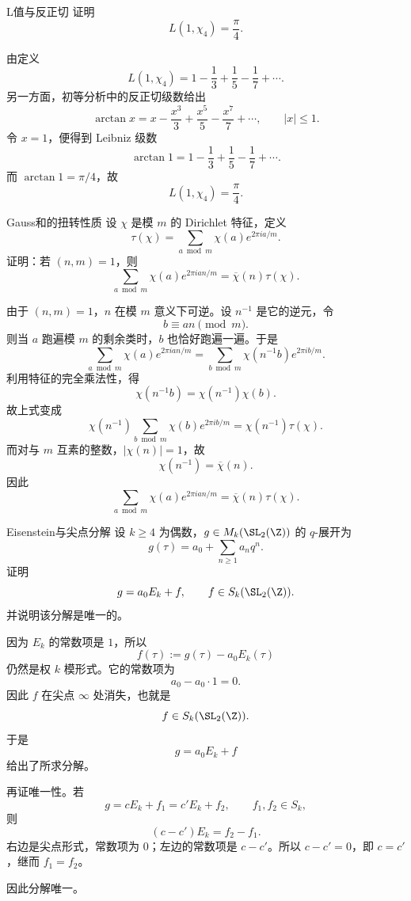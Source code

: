 \begin{problem}{L值与反正切}
\hard
证明
\[
L(1,\chi_4)=\frac{\pi}{4}.
\]
\end{problem}
\begin{solution}
由定义
\[
L(1,\chi_4)=1-\frac13+\frac15-\frac17+\cdots.
\]
另一方面，初等分析中的反正切级数给出
\[
\arctan x=x-\frac{x^3}{3}+\frac{x^5}{5}-\frac{x^7}{7}+\cdots,
\qquad |x|\le 1.
\]
令 $x=1$，便得到 Leibniz 级数
\[
\arctan 1=1-\frac13+\frac15-\frac17+\cdots.
\]
而 $\arctan 1=\pi/4$，故
\[
L(1,\chi_4)=\frac{\pi}{4}.
\]
\end{solution}

\begin{problem}{Gauss和的扭转性质}
\hard
设 $\chi$ 是模 $m$ 的 Dirichlet 特征，定义
\[
\tau(\chi)=\sum_{a\bmod m}\chi(a)e^{2\pi i a/m}.
\]
证明：若 $(n,m)=1$，则
\[
\sum_{a\bmod m}\chi(a)e^{2\pi i an/m}=\overline{\chi}(n)\tau(\chi).
\]
\end{problem}
\begin{solution}
由于 $(n,m)=1$，$n$ 在模 $m$ 意义下可逆。设 $n^{-1}$ 是它的逆元，令
\[
b\equiv an \pmod m.
\]
则当 $a$ 跑遍模 $m$ 的剩余类时，$b$ 也恰好跑遍一遍。于是
\[
\sum_{a\bmod m}\chi(a)e^{2\pi i an/m}
=\sum_{b\bmod m}\chi(n^{-1}b)e^{2\pi i b/m}.
\]
利用特征的完全乘法性，得
\[
\chi(n^{-1}b)=\chi(n^{-1})\chi(b).
\]
故上式变成
\[
\chi(n^{-1})\sum_{b\bmod m}\chi(b)e^{2\pi i b/m}
=\chi(n^{-1})\tau(\chi).
\]
而对与 $m$ 互素的整数，$|\chi(n)|=1$，故
\[
\chi(n^{-1})=\overline{\chi}(n).
\]
因此
\[
\sum_{a\bmod m}\chi(a)e^{2\pi i an/m}=\overline{\chi}(n)\tau(\chi).
\]
\end{solution}

\begin{problem}{Eisenstein与尖点分解}
\hard
设 $k\ge 4$ 为偶数，$g\in M_k(\SL_2(\Z))$ 的 $q$-展开为
\[
g(\tau)=a_0+\sum_{n\ge1}a_n q^n.
\]
证明
\[
g=a_0E_k+f,
\qquad f\in S_k(\SL_2(\Z)).
\]
并说明该分解是唯一的。
\end{problem}
\begin{solution}
因为 $E_k$ 的常数项是 $1$，所以
\[
f(\tau):=g(\tau)-a_0E_k(\tau)
\]
仍然是权 $k$ 模形式。它的常数项为
\[
a_0-a_0\cdot 1=0.
\]
因此 $f$ 在尖点 $\infty$ 处消失，也就是
\[
f\in S_k(\SL_2(\Z)).
\]
于是
\[
g=a_0E_k+f
\]
给出了所求分解。

再证唯一性。若
\[
g=cE_k+f_1=c'E_k+f_2,
\qquad f_1,f_2\in S_k,
\]
则
\[
(c-c')E_k=f_2-f_1.
\]
右边是尖点形式，常数项为 $0$；左边的常数项是 $c-c'$。所以 $c-c'=0$，即 $c=c'$，继而 $f_1=f_2$。

因此分解唯一。
\end{solution}

